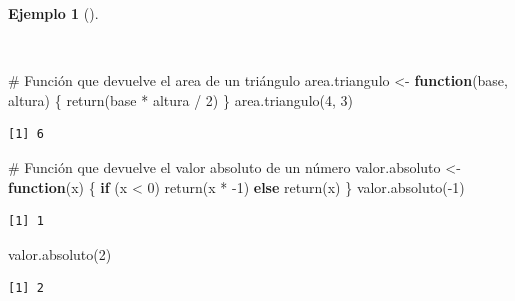 \documentclass[
  spanish,
  a4paper,
]{scrreport}
\newenvironment{Shaded}{\begin{snugshade}}{\end{snugshade}}
\newcommand{\CommentTok}[1]{\textcolor[rgb]{0.37,0.37,0.37}{#1}}
\newcommand{\ControlFlowTok}[1]{\textcolor[rgb]{0.00,0.23,0.31}{\textbf{#1}}}
\newcommand{\DecValTok}[1]{\textcolor[rgb]{0.68,0.00,0.00}{#1}}
\newcommand{\FunctionTok}[1]{\textcolor[rgb]{0.28,0.35,0.67}{#1}}
\newcommand{\NormalTok}[1]{\textcolor[rgb]{0.00,0.23,0.31}{#1}}
\newcommand{\OtherTok}[1]{\textcolor[rgb]{0.00,0.23,0.31}{#1}}
\newcommand{\SpecialCharTok}[1]{\textcolor[rgb]{0.37,0.37,0.37}{#1}}
\theoremstyle{definition}
\theoremstyle{definition}
\newtheorem{example}{Ejemplo}[chapter]
\theoremstyle{remark}
\begin{document}
\begin{example}[]\protect\hypertarget{exm-retorno-funciones}{}\label{exm-retorno-funciones}

~

\begin{Shaded}
\begin{Highlighting}[]
\CommentTok{\# Función que devuelve el area de un triángulo}
\NormalTok{area.triangulo }\OtherTok{\textless{}{-}} \ControlFlowTok{function}\NormalTok{(base, altura) \{}
  \FunctionTok{return}\NormalTok{(base }\SpecialCharTok{*}\NormalTok{ altura }\SpecialCharTok{/} \DecValTok{2}\NormalTok{)}
\NormalTok{\}}
\FunctionTok{area.triangulo}\NormalTok{(}\DecValTok{4}\NormalTok{, }\DecValTok{3}\NormalTok{)}
\end{Highlighting}
\end{Shaded}

\begin{verbatim}
[1] 6
\end{verbatim}

\begin{Shaded}
\begin{Highlighting}[]
\CommentTok{\# Función que devuelve el valor absoluto de un número}
\NormalTok{valor.absoluto }\OtherTok{\textless{}{-}} \ControlFlowTok{function}\NormalTok{(x) \{}
  \ControlFlowTok{if}\NormalTok{ (x }\SpecialCharTok{\textless{}} \DecValTok{0}\NormalTok{)}
    \FunctionTok{return}\NormalTok{(x }\SpecialCharTok{*} \SpecialCharTok{{-}}\DecValTok{1}\NormalTok{)}
  \ControlFlowTok{else}
    \FunctionTok{return}\NormalTok{(x)}
\NormalTok{\}}
\FunctionTok{valor.absoluto}\NormalTok{(}\SpecialCharTok{{-}}\DecValTok{1}\NormalTok{)}
\end{Highlighting}
\end{Shaded}

\begin{verbatim}
[1] 1
\end{verbatim}

\begin{Shaded}
\begin{Highlighting}[]
\FunctionTok{valor.absoluto}\NormalTok{(}\DecValTok{2}\NormalTok{)}
\end{Highlighting}
\end{Shaded}

\begin{verbatim}
[1] 2
\end{verbatim}

\end{example}
\end{document}
